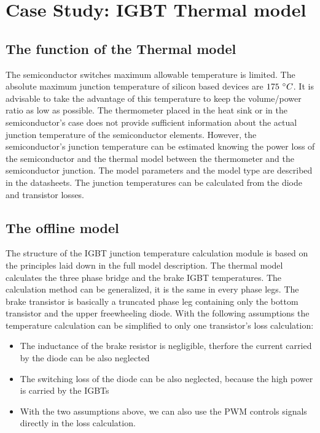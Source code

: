 \section{Case Study: IGBT Thermal model}

\subsection{The function of the Thermal model}
The semiconductor switches maximum allowable temperature is limited. The absolute maximum junction temperature of silicon based devices  are $175\ \degree{}C$. It is advisable to take the advantage of this temperature to keep the volume/power ratio as low as possible. The thermometer placed in the heat sink or in the semiconductor's case does not provide sufficient information about the actual junction temperature of the semiconductor elements. However, the semiconductor's junction temperature can be estimated knowing the power loss of the semiconductor and the thermal model between the thermometer and the semiconductor junction. The model parameters and the model type are described in the datasheets. The junction temperatures can be calculated from the diode and transistor losses.

\subsection{The offline model}
The structure of the IGBT junction temperature calculation module is based on the principles laid down in the full model description. The thermal model calculates the three phase bridge and the brake IGBT temperatures. The calculation method can be generalized, it is the same in every phase legs. The brake transistor is basically a truncated phase leg containing only the bottom transistor and the upper freewheeling diode. With the following assumptions the temperature calculation can be simplified to only one transistor's loss calculation:

\begin{itemize}
    \item The inductance of the brake resistor is negligible, therfore the current carried by the diode can be also neglected
    \item The switching loss of the diode can be also neglected, because the high power is carried by the IGBTs
    \item With the two assumptions above, we can also use the PWM controls signals directly in the loss calculation.
\end{itemize}

